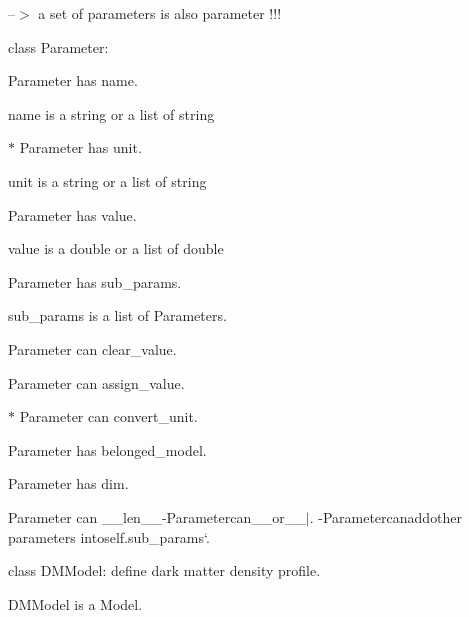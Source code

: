 \begin{DoxyItemize}
--$>$ a set of parameters is also parameter !!!
\item class {\ttfamily Parameter}\+:
\begin{DoxyItemize}
\item {\ttfamily Parameter} has {\ttfamily name}.
\begin{DoxyItemize}
\item {\ttfamily name} is a {\ttfamily string} or a {\ttfamily list} of {\ttfamily string}
\end{DoxyItemize}
\item $\ast$ {\ttfamily Parameter} has {\ttfamily unit}.
\begin{DoxyItemize}
\item {\ttfamily unit} is a {\ttfamily string} or a {\ttfamily list} of {\ttfamily string}
\end{DoxyItemize}
\item {\ttfamily Parameter} has {\ttfamily value}.
\begin{DoxyItemize}
\item {\ttfamily value} is a {\ttfamily double} or a {\ttfamily list} of {\ttfamily double}
\end{DoxyItemize}
\item {\ttfamily Parameter} has {\ttfamily sub\+\_\+params}.
\begin{DoxyItemize}
\item {\ttfamily sub\+\_\+params} is a list of {\ttfamily Parameter}s.
\end{DoxyItemize}
\item {\ttfamily Parameter} can {\ttfamily clear\+\_\+value}.
\item {\ttfamily Parameter} can {\ttfamily assign\+\_\+value}.
\item $\ast$ {\ttfamily Parameter} can {\ttfamily convert\+\_\+unit}.
\item {\ttfamily Parameter} has {\ttfamily belonged\+\_\+model}.
\item {\ttfamily Parameter} has {\ttfamily dim}.
\item {\ttfamily Parameter} can {\ttfamily \+\_\+\+\_\+len\+\_\+\+\_\+}{\ttfamily  -\/}Parameter{\ttfamily can}\+\_\+\+\_\+or\+\_\+\+\_$\vert${\ttfamily . -\/}Parameter{\ttfamily can}add{\ttfamily other parameters into}self.\+sub\+\_\+params`.
\end{DoxyItemize}
\item class {\ttfamily D\+M\+Model}\+: define dark matter density profile.
\begin{DoxyItemize}
\item {\ttfamily D\+M\+Model} is a {\ttfamily Model}.

\end{DoxyItemize}
\end{DoxyItemize}
